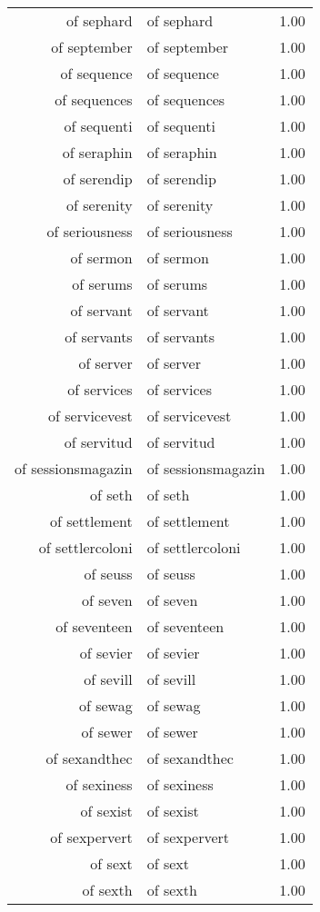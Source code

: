 \begin{table}[ht]
\begin{tabular}{rlr}
  of sephard & of sephard & 1.00 \\ 
  of september & of september & 1.00 \\ 
  of sequence & of sequence & 1.00 \\ 
  of sequences & of sequences & 1.00 \\ 
  of sequenti & of sequenti & 1.00 \\ 
  of seraphin & of seraphin & 1.00 \\ 
  of serendip & of serendip & 1.00 \\ 
  of serenity & of serenity & 1.00 \\ 
  of seriousness & of seriousness & 1.00 \\ 
  of sermon & of sermon & 1.00 \\ 
  of serums & of serums & 1.00 \\ 
  of servant & of servant & 1.00 \\ 
  of servants & of servants & 1.00 \\ 
  of server & of server & 1.00 \\ 
  of services & of services & 1.00 \\ 
  of servicevest & of servicevest & 1.00 \\ 
  of servitud & of servitud & 1.00 \\ 
  of sessionsmagazin & of sessionsmagazin & 1.00 \\ 
  of seth & of seth & 1.00 \\ 
  of settlement & of settlement & 1.00 \\ 
  of settlercoloni & of settlercoloni & 1.00 \\ 
  of seuss & of seuss & 1.00 \\ 
  of seven & of seven & 1.00 \\ 
  of seventeen & of seventeen & 1.00 \\ 
  of sevier & of sevier & 1.00 \\ 
  of sevill & of sevill & 1.00 \\ 
  of sewag & of sewag & 1.00 \\ 
  of sewer & of sewer & 1.00 \\ 
  of sexandthec & of sexandthec & 1.00 \\ 
  of sexiness & of sexiness & 1.00 \\ 
  of sexist & of sexist & 1.00 \\ 
  of sexpervert & of sexpervert & 1.00 \\ 
  of sext & of sext & 1.00 \\ 
  of sexth & of sexth & 1.00 \\ 

\end{tabular}
\end{table}
